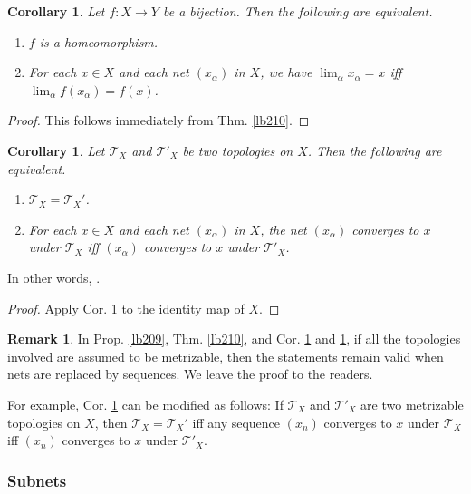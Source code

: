 \documentclass[12pt,b5paper,notitlepage]{article}
\theoremstyle{definition}
\newtheorem{rem}[df]{Remark}
\theoremstyle{plain}
\newtheorem{co}[df]{Corollary}
\newcommand{\MT}{\mathcal T}
\newcommand{\hqed}{\hfill\qedsymbol}
\numberwithin{equation}{section}
\begin{document}
\begin{co}\label{lb211}
Let $f:X\rightarrow Y$ be a bijection. Then the following are equivalent.
\begin{enumerate}
\item[(1)] $f$ is a homeomorphism.
\item[(2)] For each $x\in X$ and each net $(x_\alpha)$ in $X$, we have $\lim_\alpha x_\alpha=x$ iff $\lim_\alpha f(x_\alpha)=f(x)$. 
\end{enumerate}
\end{co}

\begin{proof}
This follows immediately from Thm. \ref{lb210}.
\end{proof}

\begin{co}\label{lb212}
Let $\MT_X$ and $\MT'_X$ be two topologies on $X$. Then the following are equivalent.
\begin{enumerate}
\item[(1)] $\MT_X=\MT_X'$.
\item[(2)] For each $x\in X$ and each net $(x_\alpha)$ in $X$, the net $(x_\alpha)$ converges to $x$ under $\MT_X$ iff $(x_\alpha)$ converges to $x$ under $\MT'_X$. 
\end{enumerate}
\end{co}

In other words, .


\begin{proof}
Apply Cor. \ref{lb211} to the identity map of $X$.
\end{proof}


\begin{rem}
In Prop. \ref{lb209}, Thm. \ref{lb210}, and Cor. \ref{lb211} and \ref{lb212}, if all the topologies involved are assumed to be metrizable, then the statements remain valid when nets are replaced by sequences. We leave the proof to the readers.

For example, Cor. \ref{lb212} can be modified as follows: If $\MT_X$ and $\MT'_X$ are two metrizable topologies on $X$, then $\MT_X=\MT_X'$ iff any sequence $(x_n)$ converges to $x$ under $\MT_X$ iff $(x_n)$ converges to $x$ under $\MT'_X$. \hqed
\end{rem}



\subsubsection{Subnets}
\end{document}

